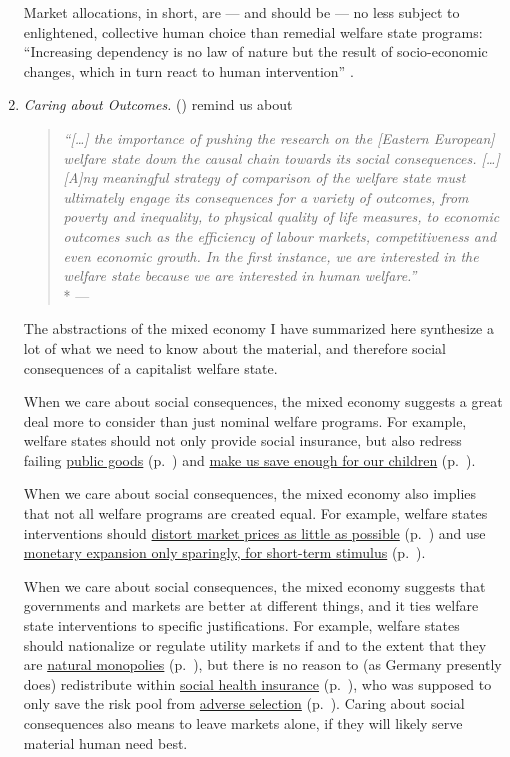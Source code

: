\begin{enumerate}
	Market allocations, in short, are --- and should be --- no less subject to enlightened, collective human choice than remedial welfare state programs:
	``Increasing dependency is no law of nature but the result of socio-economic changes, which in turn react to human intervention'' \citep[x]{Esping-Andersen2002}.

	\item \emph{Caring about Outcomes.} \citeauthor{Haggard2009} (\citeyear[236]{Haggard2009}) remind us about
	\begin{quote}
		\emph{``[\ldots]
		the importance of pushing the research on the [Eastern European] welfare state down the causal chain towards its social consequences.
		[\ldots]
		[A]ny meaningful strategy of comparison of the welfare state must ultimately engage its consequences for a variety of outcomes, from poverty and inequality, to physical quality of life measures, to economic outcomes such as the efficiency of labour markets, competitiveness and even economic growth.
		In the first instance, we are interested in the welfare state because we are interested in human welfare.''}
		\\*
		--- \citet*[236]{Haggard2009}
	\end{quote}

	The abstractions of the mixed economy I have summarized here synthesize a lot of what we need to know about the material, and therefore social consequences of a capitalist welfare state.

	When we care about social consequences, the mixed economy suggests a great deal more to consider than just nominal welfare programs.
For example, welfare states should not only provide social insurance, but also redress failing \hyperref[sec:public-good]{public goods} (p.~\pageref{sec:public-good}) and \hyperref[sec:long-term-inconsistency]{make us save enough for our children} (p.~\pageref{sec:long-term-inconsistency}).

	When we care about social consequences, the mixed economy also implies that not all welfare programs are created equal.
For example, welfare states interventions should \hyperref[sec:minimal-DWL]{distort market prices as little as possible} (p.~\pageref{sec:minimal-DWL}) and use \hyperref[sec:price-stability]{monetary expansion only sparingly, for short-term stimulus} (p.~\pageref{sec:price-stability}).

	When we care about social consequences, the mixed economy suggests that  governments and markets are better at different things, and it ties welfare state interventions to specific justifications.
For example, welfare states should nationalize or regulate utility markets if and to the extent that they are \hyperref[sec:natural-monopoly]{natural monopolies} (p.~\pageref{sec:natural-monopoly}), but there is no reason to (as Germany presently does) redistribute within \hyperref[sec:state-insurance]{social health insurance} (p.~\pageref{sec:state-insurance}), who was supposed to only save the risk pool from \hyperref[sec:adverse-selection]{adverse selection} (p.~\pageref{sec:adverse-selection}).
Caring about social consequences also means to leave markets alone, if they will likely serve material human need best.


\end{enumerate}
